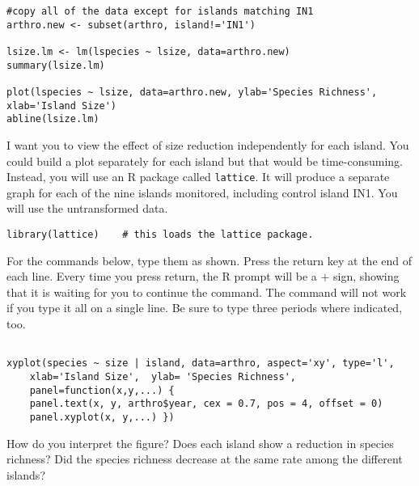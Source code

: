 \documentclass[11pt]{article}
\begin{document}
\begin{verbatim}
#copy all of the data except for islands matching IN1
arthro.new <- subset(arthro, island!='IN1')  

lsize.lm <- lm(lspecies ~ lsize, data=arthro.new)
summary(lsize.lm)

plot(lspecies ~ lsize, data=arthro.new, ylab='Species Richness', xlab='Island Size')
abline(lsize.lm)

\end{verbatim}

I want you to view the effect of size reduction independently for each island.  You could build a plot separately for each island but that would be time-consuming.  Instead, you will use an R package called \texttt{lattice}.  It will produce a separate graph for each of the nine islands monitored, including control island IN1. You will use the untransformed data.


\begin{verbatim}
library(lattice)	# this loads the lattice package.

\end{verbatim}


For the commands below, type them as shown. Press the return key at the end of each line. Every time you press return, the R prompt will be a $+$ sign, showing that it is waiting for you to continue the command.  The command will not work if you type it all on a single line. Be sure to type three periods where indicated, too.

\begin{verbatim}

xyplot(species ~ size | island, data=arthro, aspect='xy', type='l', 
    xlab='Island Size',  ylab= 'Species Richness', 
    panel=function(x,y,...) {
    panel.text(x, y, arthro$year, cex = 0.7, pos = 4, offset = 0)
    panel.xyplot(x, y,...) })

\end{verbatim}

How do you interpret the figure? Does each island show a reduction in species richness?  Did the species richness decrease at the same rate among the different islands?
\end{document}
